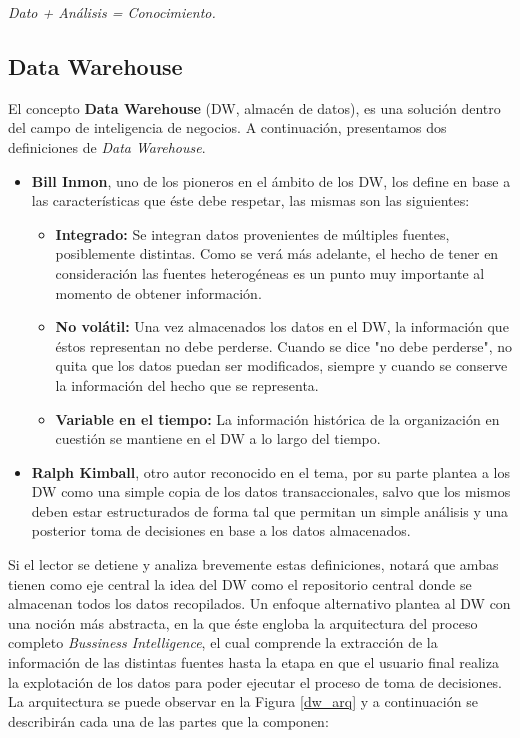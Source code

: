 \documentclass[a4paper,11pt]{article}
\begin{document}
    \begin{center}
      \textit{Dato + Análisis = Conocimiento.}
    \end{center}


    \subsection{Data Warehouse}
    
    El concepto \textbf{Data Warehouse} (DW, almacén de datos), es una solución dentro del campo de inteligencia de negocios.
    A continuación, presentamos dos definiciones de \textit{Data Warehouse}.

    \begin{itemize}
      \item \textbf{Bill Inmon}, uno de los pioneros en el ámbito de los DW, los define en base a las características que éste debe respetar, las mismas son
      las siguientes:
      \begin{itemize}
        \item \textbf{Integrado:} Se integran datos provenientes de múltiples fuentes, posiblemente distintas. Como se verá más adelante, el hecho de tener
        en consideración las fuentes heterogéneas es un punto muy importante al momento de obtener información.
        \item \textbf{No volátil:} Una vez almacenados los datos en el DW, la información que éstos representan no debe perderse. Cuando se dice
        "no debe perderse", no quita que los datos puedan ser modificados, siempre y cuando se conserve la información del hecho que se representa.
        \item \textbf{Variable en el tiempo:} La información histórica de la organización en cuestión se mantiene en el DW a lo largo del tiempo.
      \end{itemize}
      \item \textbf{Ralph Kimball}, otro autor reconocido en el tema, por su parte plantea a los DW como una simple copia de los datos transaccionales,
      salvo que los mismos deben estar estructurados de forma tal que permitan un simple análisis y una posterior toma de decisiones en base a los
      datos almacenados.
    \end{itemize}
    
    Si el lector se detiene y analiza brevemente estas definiciones, notará que ambas tienen como eje central la idea del DW como el repositorio central
    donde se almacenan todos los datos recopilados. Un enfoque alternativo plantea al DW con una noción más abstracta, en la que éste engloba
    la arquitectura del proceso completo \textit{Bussiness Intelligence}, el cual comprende la
    extracción de la información de las distintas fuentes hasta la etapa en que el usuario final realiza la explotación de los datos para poder ejecutar el
    proceso de toma de decisiones. La arquitectura se puede observar en la Figura \ref{dw_arq} y a continuación se describirán cada
    una de las partes que la componen:
\end{document}
